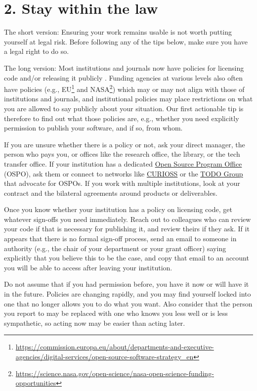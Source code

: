 \documentclass[10pt,letterpaper]{article}
\begin{document}
\section*{2. Stay within the law}

The short version:
Ensuring your work remains usable is not worth putting yourself at legal risk.
Before following any of the tips below,
make sure you have a legal right to do so.

The long version:
Most institutions and journals now have policies for licensing code and/or releasing it publicly \cite{Katz2018,Ham2019}.
Funding agencies at various levels also often have policies
(e.g.,
EU\footnote{\url{https://commission.europa.eu/about/departments-and-executive-agencies/digital-services/open-source-software-strategy_en}}
and NASA\footnote{\url{https://science.nasa.gov/open-science/nasa-open-science-funding-opportunities}})
which may or may not align with those of institutions and journals,
and institutional policies may place restrictions on what you are allowed to say publicly about your situation.
Our first actionable tip is therefore to find out what those policies are,
e.g.,
whether you need explicitly permission to publish your software,
and if so,
from whom.

If you are unsure whether there is a policy or not,
ask your direct manager,
the person who pays you,
or offices like the research office,
the library,
or the tech transfer office.
If your institution has a dedicated
\href{https://sustainoss.org/academic-map/universities/index.html}{Open Source Program Office} (OSPO),
ask them
or connect to networks like \href{https://curioss.org}{CURIOSS}
or the \href{https://todogroup.org/}{TODO Group}
that advocate for OSPOs.
If you work with multiple institutions,
look at your contract and the bilateral agreements around products or deliverables.

Once you know whether your institution has a policy on licensing code,
get whatever sign-offs you need immediately.
Reach out to colleagues who can review your code if that is necessary for publishing it,
and review theirs if they ask.
If it appears that there is no formal sign-off process,
send an email to someone in authority
(e.g., the chair of your department or your grant officer)
saying explicitly that you believe this to be the case,
and copy that email to an account you will be able to access
after leaving your institution.

Do not assume that if you had permission before,
you have it now or will have it in the future.
Policies are changing rapidly,
and you may find yourself locked into one that no longer allows you to do what you want.
Also consider that the person you report to may be replaced with one who knows you less well or is less sympathetic,
so acting now may be easier than acting later.
\end{document}
